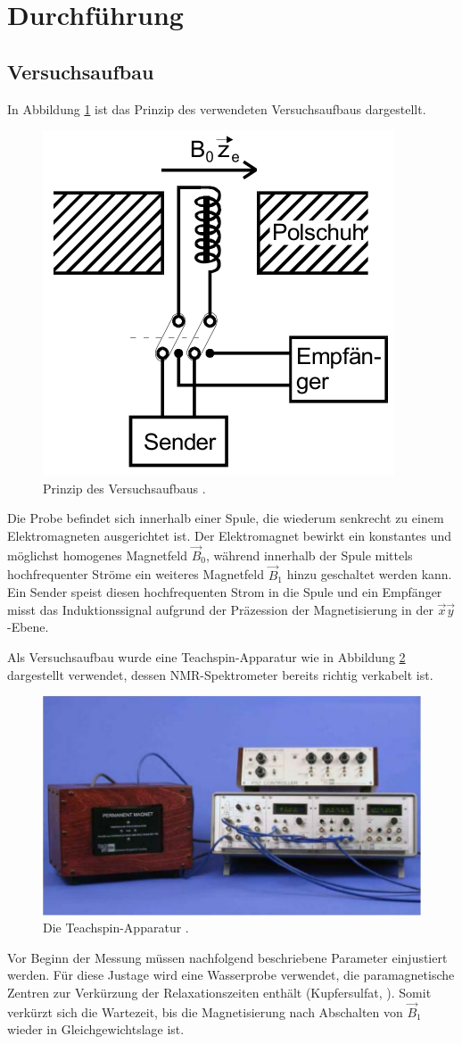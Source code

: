 \newpage
\section{Durchführung}
\label{sec:Durchführung}

\subsection{Versuchsaufbau}
\label{sec:Versuchsaufbau}

In Abbildung \ref{fig:SchemVersuchsaufbau} ist das Prinzip des verwendeten
Versuchsaufbaus dargestellt.
\begin{figure}
  \centering
  \includegraphics[width=.4\textwidth]{images/versuchsaufbau-schema.pdf}
  \caption{Prinzip des Versuchsaufbaus \cite[7]{anleitung}.}
  \label{fig:SchemVersuchsaufbau}
\end{figure}
Die Probe befindet sich innerhalb einer Spule, die wiederum senkrecht zu einem
Elektromagneten ausgerichtet ist.
Der Elektromagnet bewirkt ein konstantes und möglichst homogenes Magnetfeld $\vec{B}_0$,
während innerhalb der Spule mittels hochfrequenter Ströme ein weiteres
Magnetfeld $\vec{B}_1$ hinzu geschaltet werden kann.
Ein Sender speist diesen hochfrequenten Strom in die Spule und ein Empfänger
misst das Induktionssignal aufgrund der Präzession der Magnetisierung
in der $\vec{x} \vec{y}$-Ebene.

Als Versuchsaufbau wurde eine Teachspin-Apparatur wie in Abbildung \ref{fig:Teachspin}
dargestellt verwendet, dessen NMR-Spektrometer bereits richtig verkabelt ist.
\begin{figure}
  \centering
  \includegraphics[width=.7\textwidth]{images/teachspin.pdf}
  \caption{Die Teachspin-Apparatur \cite[17]{anleitung}.}
  \label{fig:Teachspin}
\end{figure}
Vor Beginn der Messung müssen nachfolgend beschriebene Parameter einjustiert werden.
Für diese Justage wird eine Wasserprobe verwendet, die paramagnetische Zentren zur
Verkürzung der Relaxationszeiten enthält (Kupfersulfat, ).
Somit verkürzt sich die Wartezeit, bis die Magnetisierung nach Abschalten von $\vec{B}_1$
wieder in Gleichgewichtslage ist.

